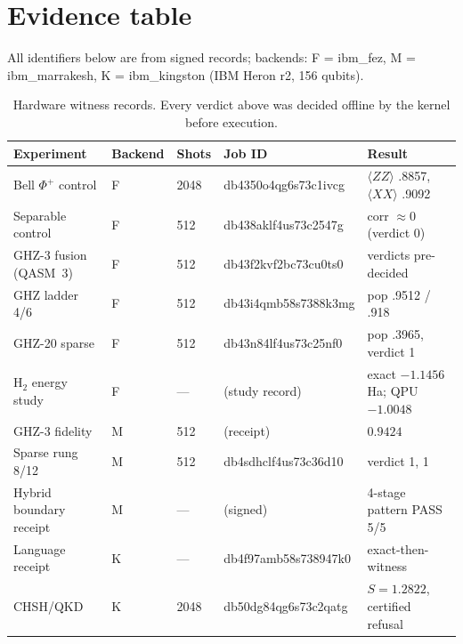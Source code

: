 \documentclass[11pt,a4paper]{report}
\begin{document}
\appendix
\chapter{Evidence table}
\label{app:evidence}
All identifiers below are from signed records; backends: F = ibm\_fez,
M = ibm\_marrakesh, K = ibm\_kingston (IBM Heron r2, 156 qubits).

\begin{table}[htbp]
\centering
\begin{tabular}{@{}lllll@{}}
\toprule
\textbf{Experiment} & \textbf{Backend} & \textbf{Shots} & \textbf{Job ID} & \textbf{Result} \\
\midrule
Bell $\Phi^+$ control      & F & 2048 & db4350o4qg6s73c1ivcg & $\langle ZZ\rangle$ .8857, $\langle XX\rangle$ .9092 \\
Separable control           & F & 512  & db438aklf4us73c2547g & corr $\approx 0$ (verdict 0) \\
GHZ-3 fusion (QASM~3)      & F & 512  & db43f2kvf2bc73cu0ts0 & verdicts pre-decided \\
GHZ ladder 4/6             & F & 512  & db43i4qmb58s7388k3mg & pop .9512 / .918 \\
GHZ-20 sparse               & F & 512  & db43n84lf4us73c25nf0 & pop .3965, verdict 1 \\
H$_2$ energy study         & F & ---  & (study record)       & exact $-1.1456$ Ha; QPU $-1.0048$ \\
GHZ-3 fidelity              & M & 512  & (receipt)            & $0.9424$ \\
Sparse rung 8/12           & M & 512  & db4sdhclf4us73c36d10 & verdict 1, 1 \\
Hybrid boundary receipt     & M & ---  & (signed)             & 4-stage pattern PASS 5/5 \\
Language receipt            & K & ---  & db4f97amb58s738947k0 & exact-then-witness \\
CHSH/QKD                   & K & 2048 & db50dg84qg6s73c2qatg & $S=1.2822$, certified refusal \\
\bottomrule
\end{tabular}
\caption{Hardware witness records. Every verdict above was decided
offline by the kernel before execution.}
\end{table}
\end{document}
